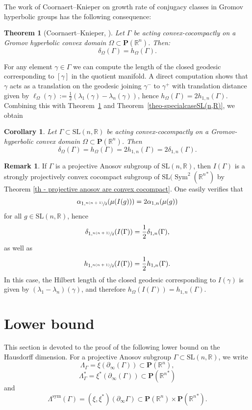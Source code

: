 \documentclass[JEP,XML,SOM,Unicode,NoEqCountersInSection,NoFloatCountersInSection,published]{cedram}
\newtheorem{theorem}[theo]{Theorem}
\newtheorem{coro}[theo]{Corollary}
\theoremstyle{definition}
\newtheorem{rmk}[theo]{Remark}
\newcommand{\proj}{\mathbf{P}}
\newcommand{\R}{\mathbb{R}}
\newcommand{\SL}{\mathrm{SL}}
\DeclareMathOperator{\Sym}{Sym}
\let\G\Gamma
\let\g\gamma
\begin{document}
The work of Coornaert--Knieper on growth rate of conjugacy classes in Gromov hyperbolic groups has the following consequence:
\begin{theorem}[Coornaert--Knieper, \cite{CK}]\label{th - delta = h for convex cocompact gromov hyperbolic}
Let $\G$ be acting convex-cocompactly on a Gromov hyperbolic convex domain $\Omega\subset \proj(\R^n)$. Then:
\[\delta_\Omega(\G)=h_\Omega(\G).\]
\end{theorem}

For any element $\g\in \G$ we can compute the length of the closed geodesic corresponding to $[\g]$ in the quotient manifold. A direct computation shows that $\g$ acts as a translation on the geodesic joining $\g^-$ to $\g^+$ with translation distance given by $\ell_{\Omega}(\g) := \frac{1}{2}(\lambda_1(\g)-\lambda_n(\g))$, hence $h_\Omega(\G)=2h_{1,n}(\G)$. Combining this with Theorem~\ref{th - delta = h for convex cocompact gromov hyperbolic} and Theorem~\ref{theo-specialcaseSL(n,R)}, we obtain
\begin{coro} \label{cor:deltaH=2delta1n}
Let $\G \subset \SL(n,\R)$ be acting convex-cocompactly on a Gromov-hyperbolic convex domain $\Omega\subset \proj(\R^n)$. Then
\[\delta_\Omega(\G)= h_\Omega(\G) = 2 h_{1,n}(\G) = 2 \delta_{1,n}(\G).\]
\end{coro}

\begin{rmk}
If $\Gamma$ is a projective Anosov subgroup of $\SL(n, \R)$, then $I(\Gamma)$ is a strongly projectively convex cocompact subgroup of $\SL(\Sym^2({\R^n}^*)$ by Theorem \ref{th - projective anosov are convex cocompact}. One easily verifies that
\[\alpha_{1, \sfrac{n(n+1)}{2}}(\mu(I(g))) = 2 \alpha_{1,n}(\mu(g))\]
for all $g\in \SL(n,\R)$, hence
\[\delta_{1, \sfrac{n(n+1)}{2}}(I(\Gamma)) = \frac{1}{2} \delta_{1,n}(\Gamma),\]
as well as
\[h_{1, \sfrac{n(n+1)}{2}}(I(\Gamma)) = \frac{1}{2} h_{1,n}(\Gamma).\]
In this case, the Hilbert length of the closed geodesic corresponding to $I(\g)$ is given by $(\lambda_1-\lambda_n)(\g)$, and therefore $h_\Omega(I(\G)) = h_{1,n}(\G)$.
\end{rmk}

\section{Lower bound} \label{sec - lower bound}
This section is devoted to the proof of the following lower bound on the Hausdorff dimension. For a projective Anosov subgroup $\G \subset \SL(n,\R)$, we write
\[\Lambda_\G = \xi(\partial_\infty(\G)) \subset \proj(\R^n),\]
\[\Lambda^*_\G = \xi^*(\partial_\infty(\G)) \subset \proj({\R^n}^*)\]
and
\[\Lambda^{\mathrm{sym}}(\G) = (\xi,\xi^*)(\partial_\infty \G) \subset \proj(\R^n)\times \proj({\R^n}^*).\]
\end{document}
